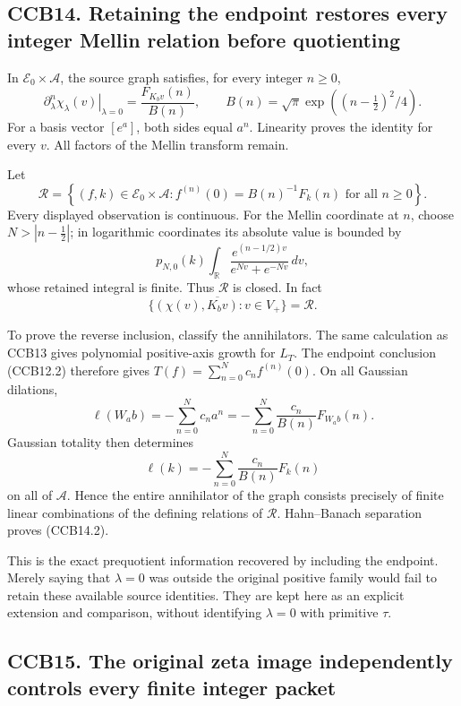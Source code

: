 \subsection{CCB14. Retaining the endpoint restores every integer Mellin
relation before
quotienting}\label{ccb14.-retaining-the-endpoint-restores-every-integer-mellin-relation-before-quotienting}

In \(\mathscr E_0\times\mathcal A\), the source graph satisfies, for
every integer \(n\ge0\), \[
\left.\partial_\lambda^n\chi_\lambda(v)\right|_{\lambda=0}
=\frac{F_{K_bv}(n)}{B(n)},
\qquad
B(n)=\sqrt\pi\exp((n-\tfrac12)^2/4).
\tag{CCB14.1}
\] For a basis vector \([e^a]\), both sides equal \(a^n\). Linearity
proves the identity for every \(v\). All factors of the Mellin transform
remain.

Let \[
\mathscr R=
\left\{(f,k)\in\mathscr E_0\times\mathcal A:
f^{(n)}(0)=B(n)^{-1}F_k(n)\text{ for all }n\ge0\right\}.
\] Every displayed observation is continuous. For the Mellin coordinate
at \(n\), choose \(N>|n-\tfrac12|\); in logarithmic coordinates its
absolute value is bounded by \[
p_{N,0}(k)\int_{\mathbb R}
\frac{e^{(n-1/2)v}}{e^{Nv}+e^{-Nv}}\,dv,
\] whose retained integral is finite. Thus \(\mathscr R\) is closed. In
fact \[
\boxed{\overline{\{(\chi(v),K_bv):v\in V_+\}}=\mathscr R.}
\tag{CCB14.2}
\]

To prove the reverse inclusion, classify the annihilators. The same
calculation as CCB13 gives polynomial positive-axis growth for \(L_T\).
The endpoint conclusion (CCB12.2) therefore gives
\(T(f)=\sum_{n=0}^N c_nf^{(n)}(0)\). On all Gaussian dilations, \[
\ell(W_a b)=-\sum_{n=0}^Nc_na^n
=-\sum_{n=0}^N\frac{c_n}{B(n)}F_{W_a b}(n).
\] Gaussian totality then determines \[
\ell(k)=-\sum_{n=0}^N\frac{c_n}{B(n)}F_k(n)
\] on all of \(\mathcal A\). Hence the entire annihilator of the graph
consists precisely of finite linear combinations of the defining
relations of \(\mathscr R\). Hahn--Banach separation proves (CCB14.2).

This is the exact prequotient information recovered by including the
endpoint. Merely saying that \(\lambda=0\) was outside the original
positive family would fail to retain these available source identities.
They are kept here as an explicit extension and comparison, without
identifying \(\lambda=0\) with primitive \(\tau\).

\subsection{CCB15. The original zeta image independently controls every
finite integer
packet}\label{ccb15.-the-original-zeta-image-independently-controls-every-finite-integer-packet}

